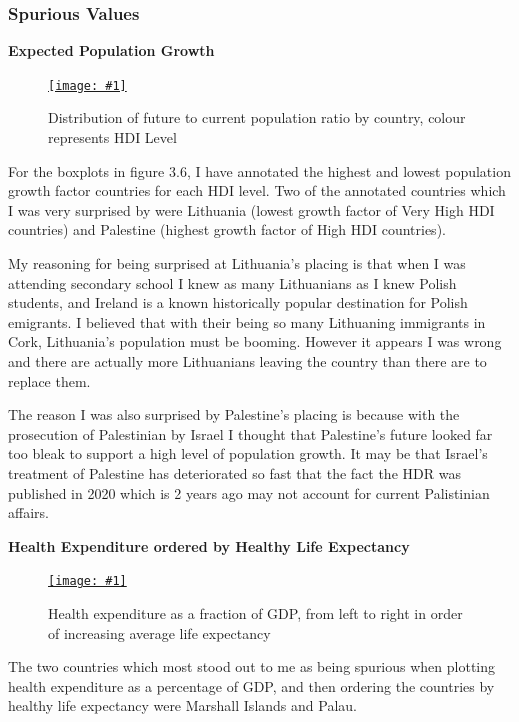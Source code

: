 \documentclass[11pt,a4paper,final]{article}
\newcommand\onlinefig[3]{
\begin{figure}[H]
  \centering
  \href{#3}{\texttt{[image: \#1]}}
  \caption{#2} 
  \label{fig:#1}
\end{figure}
}
\begin{document}
\begin{multicols}{2}
\subsubsection{Spurious Values}
\begin{flushleft}
\textbf{Expected Population Growth}
\end{flushleft}
\onlinefig{population_growth_ratio_boxplot}{Distribution of future to current population ratio by country, colour represents HDI Level}{https://public.tableau.com/views/CS3205-HDI/Sheet11?:language=en-GB&:display_count=n&:origin=viz_share_link}

For the boxplots in figure 3.6, I have annotated the highest and lowest population growth factor countries for each HDI level. Two of the annotated countries which I was very surprised by were Lithuania (lowest growth factor of Very High HDI countries) and Palestine (highest growth factor of High HDI countries).

My reasoning for being surprised at Lithuania's placing is that when I was attending secondary school I knew as many Lithuanians as I knew Polish students, and Ireland is a known historically popular destination for Polish emigrants. I believed that with their being so many Lithuaning immigrants in Cork, Lithuania's population must be booming. However it appears I was wrong and there are actually more Lithuanians leaving the country than there are to replace them.

The reason I was also surprised by Palestine's placing is because with the prosecution of Palestinian by Israel I thought that Palestine's future looked far too bleak to support a high level of population growth. It may be that Israel's treatment of Palestine has deteriorated so fast that the fact the HDR was published in 2020 which is 2 years ago may not account for current Palistinian affairs.
\vfill\null
\columnbreak

\begin{flushleft}
\textbf{Health Expenditure ordered by Healthy Life Expectancy}
\end{flushleft}
\onlinefig{health_expenditure_ordered_by_life_expectancy}{Health expenditure as a fraction of GDP, from left to right in order of increasing average life expectancy}{https://public.tableau.com/views/CS3205-HDI/Sheet9?:language=en-GB&:display_count=n&:origin=viz_share_link}

The two countries which most stood out to me as being spurious when plotting health expenditure as a percentage of GDP, and then ordering the countries by healthy life expectancy were Marshall Islands and Palau.


\end{multicols}
\end{document}
